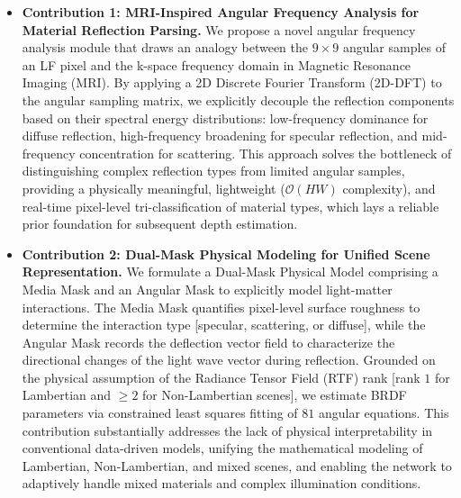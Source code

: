 \begin{itemize}\item \textbf{Contribution 1: MRI-Inspired Angular Frequency Analysis for Material Reflection Parsing.} We propose a novel angular frequency analysis module that draws an analogy between the $9 \times 9$ angular samples of an LF pixel and the k-space frequency domain in Magnetic Resonance Imaging (MRI). By applying a 2D Discrete Fourier Transform (2D-DFT) to the angular sampling matrix, we explicitly decouple the reflection components based on their spectral energy distributions: low-frequency dominance for diffuse reflection, high-frequency broadening for specular reflection, and mid-frequency concentration for scattering. This approach solves the bottleneck of distinguishing complex reflection types from limited angular samples, providing a physically meaningful, lightweight ($\mathcal{O}(HW)$ complexity), and real-time pixel-level tri-classification of material types, which lays a reliable prior foundation for subsequent depth estimation.\end{itemize}

\begin{itemize}\item \textbf{Contribution 2: Dual-Mask Physical Modeling for Unified Scene Representation.} We formulate a Dual-Mask Physical Model comprising a Media Mask and an Angular Mask to explicitly model light-matter interactions. The Media Mask quantifies pixel-level surface roughness to determine the interaction type  [specular, scattering, or diffuse], while the Angular Mask records the deflection vector field to characterize the directional changes of the light wave vector during reflection. Grounded on the physical assumption of the Radiance Tensor Field (RTF) rank  [rank $1$ for Lambertian and $\ge 2$ for Non-Lambertian scenes], we estimate BRDF parameters via constrained least squares fitting of $81$ angular equations. This contribution substantially addresses the lack of physical interpretability in conventional data-driven models, unifying the mathematical modeling of Lambertian, Non-Lambertian, and mixed scenes, and enabling the network to adaptively handle mixed materials and complex illumination conditions.\end{itemize}

